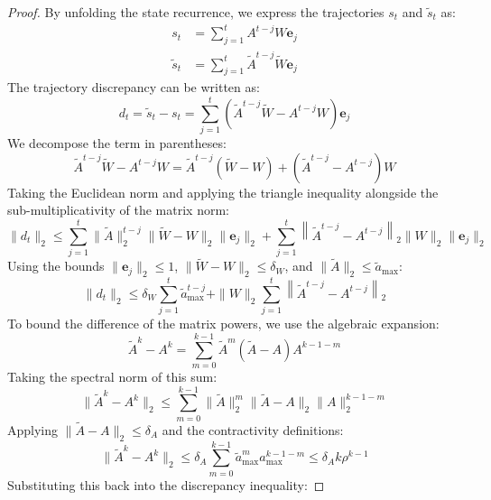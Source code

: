 \begin{proof}
By unfolding the state recurrence, we express the trajectories $s_t$ and $\tilde{s}_t$ as:
\begin{align}
    s_t &= \sum_{j=1}^t A^{t-j} W \mathbf{e}_j \\
    \tilde{s}_t &= \sum_{j=1}^t \tilde{A}^{t-j} \tilde{W} \mathbf{e}_j
\end{align}
The trajectory discrepancy can be written as:
\begin{equation}
    d_t = \tilde{s}_t - s_t = \sum_{j=1}^t \left( \tilde{A}^{t-j} \tilde{W} - A^{t-j} W \right) \mathbf{e}_j
\end{equation}
We decompose the term in parentheses:
\begin{equation}
    \tilde{A}^{t-j} \tilde{W} - A^{t-j} W = \tilde{A}^{t-j} (\tilde{W} - W) + \left( \tilde{A}^{t-j} - A^{t-j} \right) W
\end{equation}
Taking the Euclidean norm and applying the triangle inequality alongside the sub-multiplicativity of the matrix norm:
\begin{equation}
    \|d_t\|_2 \le \sum_{j=1}^t \|\tilde{A}\|^{t-j}_2 \|\tilde{W} - W\|_2 \|\mathbf{e}_j\|_2 + \sum_{j=1}^t \left\| \tilde{A}^{t-j} - A^{t-j} \right\|_2 \|W\|_2 \|\mathbf{e}_j\|_2
\end{equation}
Using the bounds $\|\mathbf{e}_j\|_2 \le 1$, $\|\tilde{W} - W\|_2 \le \delta_W$, and $\|\tilde{A}\|_2 \le \tilde{a}_{\max}$:
\begin{equation}
    \|d_t\|_2 \le \delta_W \sum_{j=1}^t \tilde{a}_{\max}^{t-j} + \|W\|_2 \sum_{j=1}^t \left\| \tilde{A}^{t-j} - A^{t-j} \right\|_2
\end{equation}
To bound the difference of the matrix powers, we use the algebraic expansion:
\begin{equation}
    \tilde{A}^k - A^k = \sum_{m=0}^{k-1} \tilde{A}^m (\tilde{A} - A) A^{k-1-m}
\end{equation}
Taking the spectral norm of this sum:
\begin{equation}
    \|\tilde{A}^k - A^k\|_2 \le \sum_{m=0}^{k-1} \|\tilde{A}\|_2^m \|\tilde{A} - A\|_2 \|A\|_2^{k-1-m}
\end{equation}
Applying $\|\tilde{A} - A\|_2 \le \delta_A$ and the contractivity definitions:
\begin{equation}
    \|\tilde{A}^k - A^k\|_2 \le \delta_A \sum_{m=0}^{k-1} \tilde{a}_{\max}^m a_{\max}^{k-1-m} \le \delta_A k \rho^{k-1}
\end{equation}
Substituting this back into the discrepancy inequality:

\end{proof}
